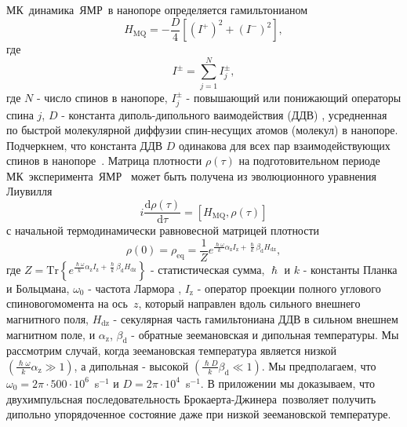 \documentclass[utf8]{jetp}
\begin{document}
МК~динамика~ЯМР~в нанопоре определяется гамильтонианом~\cite{Doronin_2019,Doronin_2009}
%
\begin{equation}
  \label{eq:1}
  H_{\mathrm{MQ}} = - \dfrac{D}{4} \left[
    \left(I^{+}\right)^{2}
    + \left(I^{-}\right)^{2}
  \right] ,
\end{equation}
%
где
%
\begin{equation}
  \label{eq:2}
  I^{\pm} = \sum\limits_{j=1}^{N} I_{j}^{\pm},
\end{equation}
%
где $N$ - число спинов в нанопоре, $I^{\pm}_{j}$ - повышающий или понижающий операторы спина $j$, $D$ - константа диполь-дипольного ваимодействия (ДДВ) , усредненная по быстрой молекулярной диффузии спин-несущих атомов (молекул) в нанопоре.
Подчеркнем, что константа ДДВ $D$ одинакова для всех пар взаимодействующих спинов в нанопоре~\cite{Doronin_2019,Doronin_2009}.
Матрица плотности $\rho(\tau)$ на подготовительном периоде МК~эксперимента~ЯМР~\cite{Baum_1985} может быть получена из эволюционного уравнения Лиувилля~\cite{Goldman_1970,Abragam_1982}
%
\begin{equation}
  \label{eq:3}
  i\dfrac{\mathrm{d}\rho(\tau)}{\mathrm{d}\tau} = \left[
  H_\mathrm{MQ},\rho(\tau)
  \right]
\end{equation}
%
с начальной термодинамически равновесной матрицей плотности
%
\begin{equation}
  \label{eq:4}
    \rho(0) = \rho_\mathrm{eq} = \dfrac{1}{Z}
    e^{
      \frac{\hslash \omega}{k} \alpha_\mathrm{z} I_\mathrm{z}
      + \frac{\hslash }{k} \beta_\mathrm{d} H_\mathrm{dz}
    },
\end{equation}
%
где
$Z = \mathrm{Tr} \left\{ e^{\frac{\hslash \omega}{k} \alpha_\mathrm{z} I_\mathrm{z} + \frac{\hslash }{k} \beta_\mathrm{d} H_\mathrm{dz}} \right\}$ - статистическая сумма,
$\hslash$ и $k$ - константы Планка и Больцмана,
$\omega_{0}$ - частота Лармора ,
$I_\mathrm{z}$ -  оператор проекции полного углового спиновогомомента  на ось~$z$,
который направлен вдоль сильного внешнего магнитного поля,
$H_\mathrm{dz}$ - секулярная часть гамильтониана ДДВ в сильном внешнем магнитном поле,
и $\alpha_\mathrm{z}$, $\beta_\mathrm{d}$ - обратные зеемановская и дипольная температуры.
Мы рассмотрим случай, когда зеемановская температура  является низкой $({\frac{\hslash \omega}{k} \alpha_\mathrm{z}}\gg 1)$,
а дипольная - высокой $\left( \frac{\hslash{D}}{k}\beta_\mathrm{d} \ll 1\right)$.
Мы предполагаем, что $\omega_{0} = 2\pi \cdot 500 \cdot 10^{6}$~s$^{-1}$ и $D = 2\pi \cdot 10^{4}$~s$^{-1}$.
В приложении мы доказываем, что двухимпульсная последовательность Брокаерта-Джинера~\cite{Goldman_1970,Jeener_1967}позволяет получить дипольно упорядоченное состояние даже при низкой зеемановской температуре.
\end{document}
